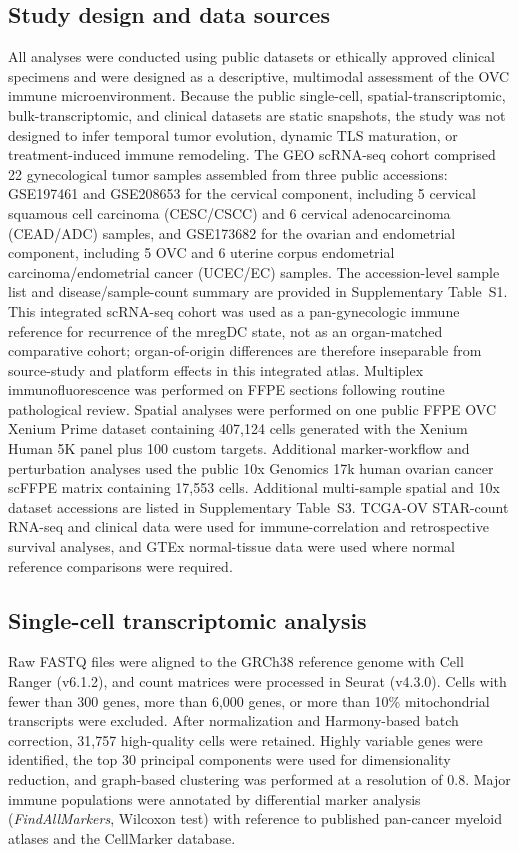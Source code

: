 \documentclass[cancers,article,submit,pdftex,moreauthors]{Definitions/mdpi}
\begin{document}
\subsection{Study design and data sources}
All analyses were conducted using public datasets or ethically approved clinical specimens and were designed as a descriptive, multimodal assessment of the OVC immune microenvironment. Because the public single-cell, spatial-transcriptomic, bulk-transcriptomic, and clinical datasets are static snapshots, the study was not designed to infer temporal tumor evolution, dynamic TLS maturation, or treatment-induced immune remodeling. The GEO scRNA-seq cohort comprised 22 gynecological tumor samples assembled from three public accessions: GSE197461 and GSE208653 for the cervical component, including 5 cervical squamous cell carcinoma (CESC/CSCC) and 6 cervical adenocarcinoma (CEAD/ADC) samples, and GSE173682 for the ovarian and endometrial component, including 5 OVC and 6 uterine corpus endometrial carcinoma/endometrial cancer (UCEC/EC) samples\cite{bib115,bib116,bib117}. The accession-level sample list and disease/sample-count summary are provided in Supplementary Table~S1. This integrated scRNA-seq cohort was used as a pan-gynecologic immune reference for recurrence of the mregDC state, not as an organ-matched comparative cohort; organ-of-origin differences are therefore inseparable from source-study and platform effects in this integrated atlas. Multiplex immunofluorescence was performed on FFPE sections following routine pathological review. Spatial analyses were performed on one public FFPE OVC Xenium Prime dataset containing 407,124 cells generated with the Xenium Human 5K panel plus 100 custom targets\cite{bib53,bib54,bib55}. Additional marker-workflow and perturbation analyses used the public 10x Genomics 17k human ovarian cancer scFFPE matrix containing 17,553 cells. Additional multi-sample spatial and 10x dataset accessions are listed in Supplementary Table~S3. TCGA-OV STAR-count RNA-seq and clinical data were used for immune-correlation and retrospective survival analyses, and GTEx normal-tissue data were used where normal reference comparisons were required\cite{bib58}.

\subsection{Single-cell transcriptomic analysis}
Raw FASTQ files were aligned to the GRCh38 reference genome with Cell Ranger (v6.1.2), and count matrices were processed in Seurat (v4.3.0)\cite{bib34,bib35,bib36}. Cells with fewer than 300 genes, more than 6,000 genes, or more than 10\% mitochondrial transcripts were excluded\cite{bib37,bib38}. After normalization and Harmony-based batch correction, 31,757 high-quality cells were retained. Highly variable genes were identified, the top 30 principal components were used for dimensionality reduction, and graph-based clustering was performed at a resolution of 0.8\cite{bib39,bib40,bib41,bib42,bib43}. Major immune populations were annotated by differential marker analysis (\textit{FindAllMarkers}, Wilcoxon test) with reference to published pan-cancer myeloid atlases and the CellMarker database\cite{bib21,bib44}.
\end{document}
